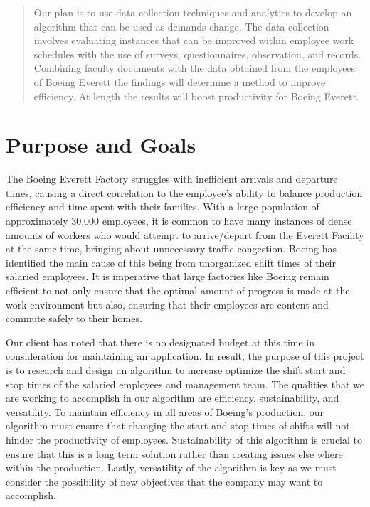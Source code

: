 \documentclass[onecolumn, draftclsnofoot,10pt, compsoc]{IEEEtran}
\begin{document}
\begin{titlepage}
\begin{singlespace}
\begin{abstract}
        Our plan is to use data collection techniques and analytics to develop an algorithm that can be used as demands change. 
        The data collection involves evaluating instances that can be improved within employee work schedules with the use of surveys, questionnaires, observation, and records. 
        Combining faculty documents with the data obtained from the employees of Boeing Everett the findings will determine a method to improve efficiency. At length the results will boost productivity for Boeing Everett. 
        \end{abstract}     
    \end{singlespace}
\end{titlepage}
\newpage
{}
\tableofcontents
\clearpage

\section{Purpose and Goals}
\indent \indent The Boeing Everett Factory struggles with inefficient arrivals and departure times, causing a direct correlation to the employee’s ability to balance production efficiency and time spent with their families. 
With a large population of approximately 30,000 employees, it is common to have many instances of dense amounts of workers who would attempt to arrive/depart from the Everett Facility at the same time, bringing about unnecessary traffic congestion. 
Boeing has identified the main cause of this being from unorganized shift times of their salaried employees.
It is imperative that large factories like Boeing remain efficient to not only ensure that the optimal amount of progress is made at the work environment but also, ensuring that their employees are content and commute safely to their homes.
  
Our client has noted that there is no designated budget at this time in consideration for maintaining an application.
In result, the purpose of this project is to research and design an algorithm to increase optimize the shift start and stop times of the salaried employees and management team. 
The qualities that we are working to accomplish in our algorithm are efficiency, sustainability, and versatility. 
To maintain efficiency in all areas of Boeing's production, our algorithm must ensure that changing the start and stop times of shifts will not hinder the productivity of employees. Sustainability of this algorithm is crucial to ensure that this is a long term solution rather than creating issues else where within the production. 
Lastly, versatility of the algorithm is key as we must consider the possibility of new objectives that the company may want to accomplish.
\end{document}
